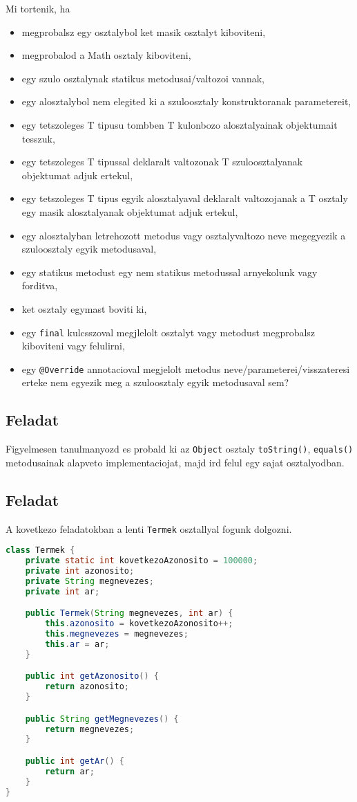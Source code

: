 \documentclass{article}
\let\l\lstinline
\begin{document}
Mi tortenik, ha
\begin{itemize}
    \item megprobalsz egy osztalybol ket masik osztalyt kiboviteni,
    \item megprobalod a Math osztaly kiboviteni,
    \item egy szulo osztalynak statikus metodusai/valtozoi vannak,
    \item egy alosztalybol nem elegited ki a szuloosztaly konstruktoranak parametereit,
    \item egy tetszoleges T tipusu tombben T kulonbozo alosztalyainak objektumait tesszuk,
    \item egy tetszoleges T tipussal deklaralt valtozonak T szuloosztalyanak objektumat adjuk ertekul,
    \item egy tetszoleges T tipus egyik alosztalyaval deklaralt valtozojanak a T osztaly egy masik alosztalyanak objektumat adjuk ertekul,
    \item egy alosztalyban letrehozott metodus vagy osztalyvaltozo neve megegyezik a szuloosztaly egyik metodusaval,
    \item egy statikus metodust egy nem statikus metodussal arnyekolunk vagy forditva,
    \item ket osztaly egymast boviti ki,
    \item egy \l{final} kulcsszoval megjlelolt osztalyt vagy metodust megprobalsz kiboviteni vagy felulirni,
    \item egy \l{@Override} annotacioval megjelolt metodus neve/parameterei/visszateresi erteke nem egyezik meg a szuloosztaly egyik metodusaval sem?
\end{itemize}

\subsection{Feladat}

Figyelmesen tanulmanyozd es probald ki az \l{Object} osztaly \l{toString()}, \l{equals()} metodusainak alapveto implementaciojat, majd ird felul egy sajat osztalyodban.

\subsection{Feladat}

A kovetkezo feladatokban a lenti \l{Termek} osztallyal fogunk dolgozni.

\begin{lstlisting}[language=Java, caption=Feladat]
class Termek {
    private static int kovetkezoAzonosito = 100000;
    private int azonosito;
    private String megnevezes;
    private int ar;

    public Termek(String megnevezes, int ar) {
        this.azonosito = kovetkezoAzonosito++;
        this.megnevezes = megnevezes;
        this.ar = ar;
    }

    public int getAzonosito() {
        return azonosito;
    }

    public String getMegnevezes() {
        return megnevezes;
    }

    public int getAr() {
        return ar;
    }
}
\end{lstlisting}
\end{document}
